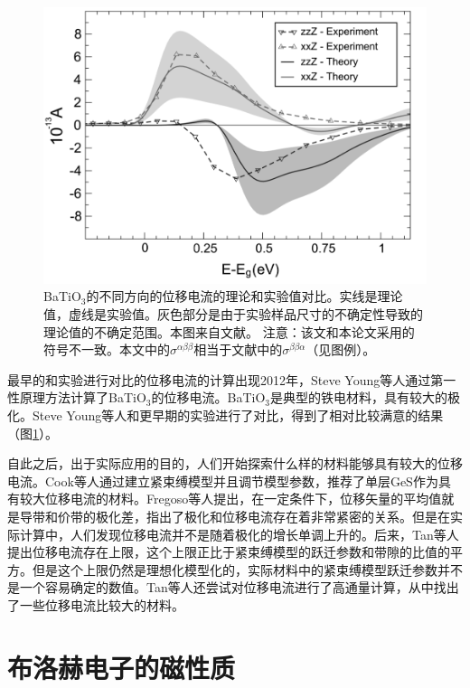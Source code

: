 \begin{figure}
\includegraphics[width=1.0\textwidth]{../figures/young-shift.png}
\caption{BaTiO$_3$的不同方向的位移电流的理论和实验值\cite{koch_anomalous_1976}对比。实线是理论值，虚线是实验值。灰色部分是由于实验样品尺寸的不确定性导致的理论值的不确定范围。本图来自文献。 注意：该文和本论文采用的符号不一致。本文中的$\sigma^{\alpha\beta\beta}$相当于文献中的$\sigma^{\beta\beta\alpha}$（见图例）。\label{young-shift}}
\end{figure}

最早的和实验进行对比的位移电流的计算出现2012年，Steve Young等人\cite{young2012}通过第一性原理方法计算了BaTiO$_3$的位移电流。BaTiO$_3$是典型的铁电材料，具有较大的极化。Steve Young等人和更早期的实验进行了对比，得到了相对比较满意的结果（图\ref{young-shift}）。

自此之后，出于实际应用的目的，人们开始探索什么样的材料能够具有较大的位移电流。Cook等人\cite{cook_design_2017}通过建立紧束缚模型并且调节模型参数，推荐了单层GeS作为具有较大位移电流的材料。Fregoso等人\cite{fregoso_quantitative_2016}提出，在一定条件下，位移矢量的平均值就是导带和价带的极化差，指出了极化和位移电流存在着非常紧密的关系。但是在实际计算中，人们发现位移电流并不是随着极化的增长单调上升的。后来，Tan等人\cite{tan_upper_2017}提出位移电流存在上限，这个上限正比于紧束缚模型的跃迁参数和带隙的比值的平方。但是这个上限仍然是理想化模型化的，实际材料中的紧束缚模型跃迁参数并不是一个容易确定的数值。Tan等人还尝试对位移电流进行了高通量计算，从中找出了一些位移电流比较大的材料。


\section{布洛赫电子的磁性质}

